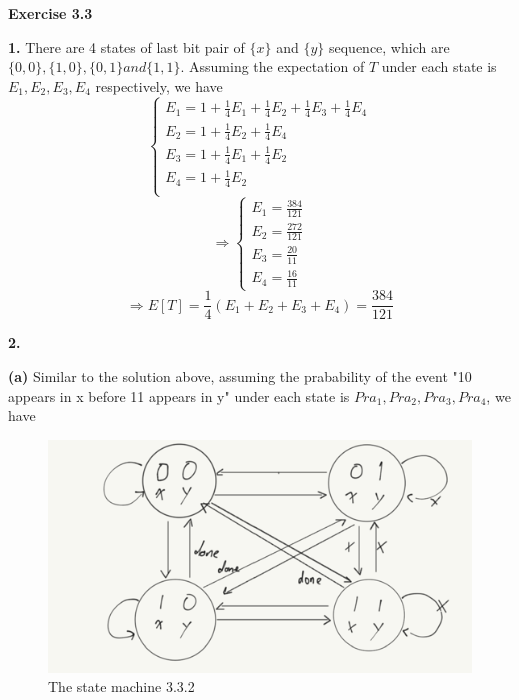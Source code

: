 \documentclass{article} %
\begin{document}
	
	



	
	\textbf{Exercise 3.3}\par
	
	\textbf{ 1.}   There are 4 states of last bit pair of $\{x\}$ and $\{y\}$ sequence, which are $\{0,0\},\{1,0\},\{0,1\} and \{1,1\}$. Assuming the expectation of $T$ under each state is $E_1,E_2,E_3,E_4$ respectively, we have
    $$
        \begin{cases}
        E_1=1+\frac{1}{4}E_1+\frac{1}{4}E_2+\frac{1}{4}E_3+\frac{1}{4}E_4\\
        E_2=1+\frac{1}{4}E_2+\frac{1}{4}E_4\\
        E_3=1+\frac{1}{4}E_1+\frac{1}{4}E_2\\
        E_4=1+\frac{1}{4}E_2\\
        \end{cases}
    $$
   $$
   	\Rightarrow 
	\begin{cases}
	E_1=\frac{384}{121}\\
	E_2=\frac{272}{121}\\
	E_3=\frac{20}{11}\\
	E_4=\frac{16}{11}
	\end{cases}
	$$
	$$\Rightarrow E[T]=\frac{1}{4}(E_1+E_2+E_3+E_4) = \frac{384}{121} $$\par
	\textbf{ 2.}
	
	\textbf{(a)}   Similar to the solution above, assuming the prabability of the event "10 appears in x before 11 appears in y" under each state is $Pra_1,Pra_2,Pra_3,Pra_4$, we have
	
	\begin{figure}[H]
		\centering
		\includegraphics[scale=0.9]{Zzz.png}
		\caption{The state machine 3.3.2}
		\label{fig:3}
	\end{figure}
\end{document}

